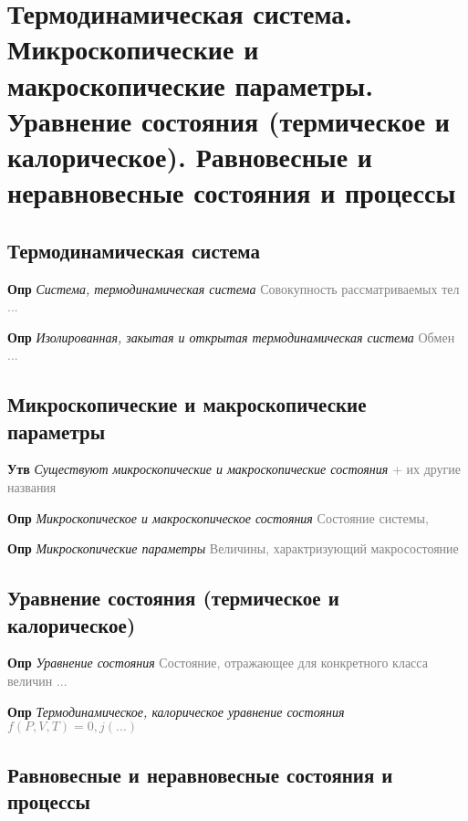 \documentclass[a4paper, 14pt]{article}
\begin{document}
    \tableofcontents \newpage

    \section{Термодинамическая система.
    Микроскопические и макроскопические параметры.
    Уравнение состояния (термическое и калорическое).
    Равновесные и неравновесные состояния и процессы}

    \subsection{Термодинамическая система}

    \textbf{Опр} \textit{Система, термодинамическая система} \textcolor{gray}{Совокупность рассматриваемых тел ...}

    \textbf{Опр} \textit{Изолированная, закытая и открытая термодинамическая система} \textcolor{gray}{Обмен ...}

    \subsection{Микроскопические и макроскопические параметры}

    \textbf{Утв} \textit{Существуют микроскопические и макроскопические состояния} \textcolor{gray}{+ их другие названия}

    \textbf{Опр} \textit{Микроскопическое и макроскопическое состояния} \textcolor{gray}{Состояние системы,}

    \textbf{Опр} \textit{Микроскопические параметры} \textcolor{gray}{Величины, характризующий макросостояние}

    \subsection{Уравнение состояния (термическое и калорическое)}

    \textbf{Опр} \textit{Уравнение состояния} \textcolor{gray}{Состояние, отражающее для конкретного класса величин ...}

    \textbf{Опр} \textit{Термодинамическое, калорическое уравнение состояния} \textcolor{gray}{$f(P, V, T) = 0, j(\dots)$}

    \subsection{Равновесные и неравновесные состояния и процессы}
\end{document}
